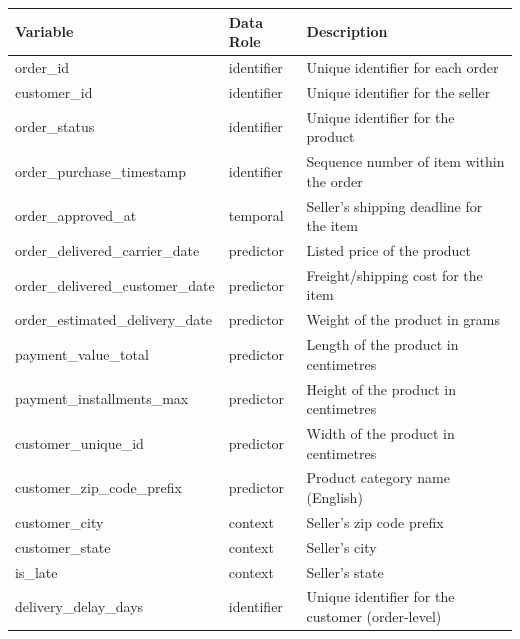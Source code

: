 \documentclass[
]{article}
\begin{document}
\begin{longtable}[]{@{}
  >{\raggedright\arraybackslash}p{}
  >{\raggedright\arraybackslash}p{}
  >{\raggedright\arraybackslash}p{}@{}}
\toprule\noalign{}
\begin{minipage}[b]{\linewidth}\raggedright
Variable
\end{minipage} & \begin{minipage}[b]{\linewidth}\raggedright
Data Role
\end{minipage} & \begin{minipage}[b]{\linewidth}\raggedright
Description
\end{minipage} \\
\midrule\noalign{}
\endhead
\bottomrule\noalign{}
\endlastfoot
order\_id & identifier & Unique identifier for each order \\
customer\_id & identifier & Unique identifier for the seller \\
order\_status & identifier & Unique identifier for the product \\
order\_purchase\_timestamp & identifier & Sequence number of item within
the order \\
order\_approved\_at & temporal & Seller's shipping deadline for the
item \\
order\_delivered\_carrier\_date & predictor & Listed price of the
product \\
order\_delivered\_customer\_date & predictor & Freight/shipping cost for
the item \\
order\_estimated\_delivery\_date & predictor & Weight of the product in
grams \\
payment\_value\_total & predictor & Length of the product in
centimetres \\
payment\_installments\_max & predictor & Height of the product in
centimetres \\
customer\_unique\_id & predictor & Width of the product in
centimetres \\
customer\_zip\_code\_prefix & predictor & Product category name
(English) \\
customer\_city & context & Seller's zip code prefix \\
customer\_state & context & Seller's city \\
is\_late & context & Seller's state \\
delivery\_delay\_days & identifier & Unique identifier for the customer
(order-level) \\

\end{longtable}
\end{document}
